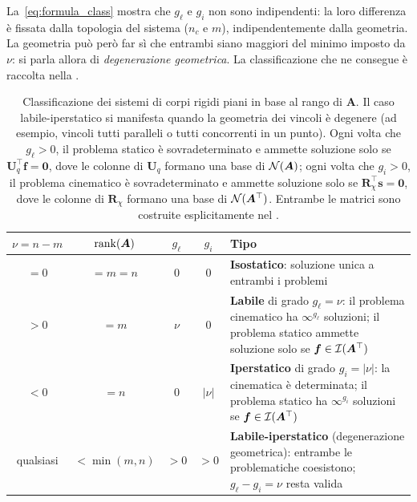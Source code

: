 La~\eqref{eq:formula_class} mostra che $g_\ell$ e
$g_i$ non sono indipendenti: la loro differenza
è fissata dalla topologia del sistema ($n_c$ e $m$),
indipendentemente dalla geometria. La geometria può però
far sì che entrambi siano maggiori del minimo imposto da
$\nu$: si parla allora di \emph{degenerazione geometrica}. La
classificazione che ne consegue è raccolta nella
.


\begin{table}[htbp]
	\centering
	\renewcommand{\arraystretch}{1.8}
	\small
	\begin{tabular}{cccc p{5.5cm}}
		\toprule
		$\nu = n - m$ & $\operatorname{rank}(\bm{A})$
		& $g_\ell$ & $g_i$ & Tipo\\
		\midrule
		$= 0$ & $= m = n$ & $0$ & $0$
		& \textbf{Isostatico}: soluzione unica
		a entrambi i problemi\\
		$> 0$ & $= m$ & $\nu$ & $0$
		& \textbf{Labile} di grado $g_\ell = \nu$:
		il problema cinematico ha $\infty^{g_\ell}$
		soluzioni; il problema statico ammette
		soluzione solo se $\bm{f} \in \mathcal{I}(\bm{A}^{\top})$\\
		$< 0$ & $= n$ & $0$ & $|\nu|$
		& \textbf{Iperstatico} di grado
		$g_i = |\nu|$: la cinematica è
		determinata; il problema statico ha
		$\infty^{g_i}$ soluzioni
		se $\bm{f} \in \mathcal{I}(\bm{A}^{\top})$\\
		\multirow{2}{*}{qualsiasi}
		& \multirow{2}{*}{$< \min(m, n)$}
		& \multirow{2}{*}{$> 0$}
		& \multirow{2}{*}{$> 0$}
		& \textbf{Labile-iperstatico}
		(degenerazione geometrica): entrambe le
		problematiche coesistono;
		$g_\ell - g_i = \nu$ resta valida\\
		\bottomrule
	\end{tabular}
	\caption{Classificazione dei sistemi di corpi rigidi piani in base	al rango di $\bm{A}$. Il caso labile-iperstatico si manifesta quando la geometria dei vincoli è degenere (ad esempio, vincoli 	tutti paralleli o tutti concorrenti in un punto). Ogni volta che 	$g_\ell > 0$, il problema statico è sovradeterminato e ammette	soluzione solo se $\bm{U}_q^{\top}\bm{f}=\bm{0}$, dove le		colonne di $\bm{U}_q$ formano una base di $\mathcal{N}(\bm{A})$; ogni	volta che $g_i > 0$, il problema cinematico è	sovradeterminato e ammette soluzione solo se $\bm{R}_\chi^{\top}\bm{s}=\bm{0}$, dove le colonne di		$\bm{R}_\chi$ formano una base di $\mathcal{N}(\bm{A}^\top)$. Entrambe	le matrici sono costruite esplicitamente nel	.}
	\label{tab:classificazione_SCR}
\end{table}

